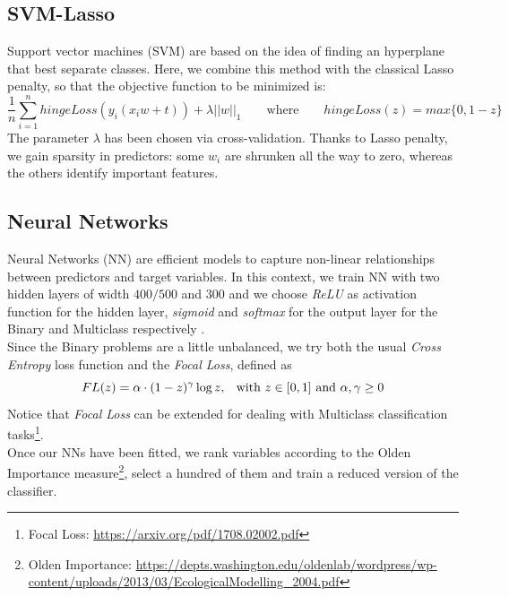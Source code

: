 \documentclass[a4paper,11pt, oneside]{article}  %
\begin{document}
\subsection{SVM-Lasso}
Support vector machines (SVM) are based on the idea of finding an hyperplane that best separate classes. Here, we combine this method with the classical Lasso penalty,  so that the objective function to be minimized is:
\begin{equation*}
	\dfrac{1}{n} \sum_{i=1}^n hingeLoss(y_i(x_i w + t)) + \lambda ||w||_1  \qquad	\text{where} \qquad  hingeLoss(z) = max\{0, 1-z\}
\end{equation*}
The parameter $\lambda$ has been chosen via cross-validation. Thanks to Lasso penalty, we gain sparsity in predictors: some $w_i$ are shrunken all the way to zero,  whereas the others identify important features. 

\subsection{Neural Networks}
Neural Networks (NN) are efficient models to capture non-linear relationships between predictors and target variables. In this context, we train NN with two hidden layers of width $400/500$ and $300$ and we choose \textit{ReLU} as activation function for the hidden layer, \textit{sigmoid} and \textit{softmax} for the output layer for the  Binary and Multiclass respectively . \\
Since the Binary problems are a little unbalanced, we try both the usual \textit{Cross Entropy} loss function and the \textit{Focal Loss}, defined as 
\begin{equation*}
	FL(z) = \alpha \cdot (1 - z)^{\gamma} \log{z} \text{,  \hspace{3pt} with }z \in [0,1]  \text{ and } \alpha,  \gamma \geq 0
\end{equation*}
Notice that \textit{Focal Loss} can be extended for dealing with Multiclass classification tasks\footnote{Focal Loss: \url{https://arxiv.org/pdf/1708.02002.pdf}}. \\
Once our NNs have been fitted, we rank variables according to the Olden Importance measure\footnote{Olden Importance: \url{https://depts.washington.edu/oldenlab/wordpress/wp-content/uploads/2013/03/EcologicalModelling_2004.pdf}},  select a hundred of them and train a reduced version of the classifier. 
\end{document}
